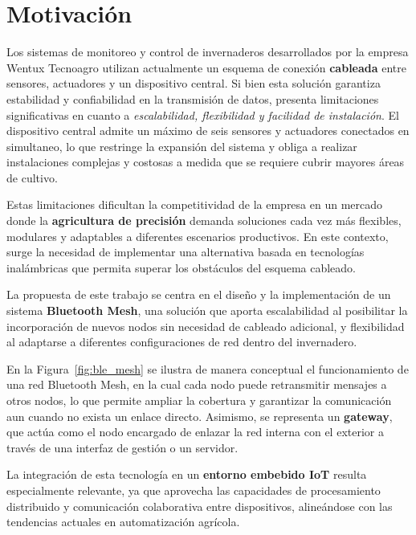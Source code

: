  

\section{Motivación}

Los sistemas de monitoreo y control de invernaderos desarrollados por la empresa Wentux Tecnoagro utilizan actualmente un esquema de conexión \textbf{cableada} entre sensores, actuadores y un dispositivo central. Si bien esta solución garantiza estabilidad y confiabilidad en la transmisión de datos, presenta limitaciones significativas en cuanto a \textit{escalabilidad, flexibilidad y facilidad de instalación}. El dispositivo central admite un máximo de seis sensores y actuadores conectados en simultaneo, lo que restringe la expansión del sistema y obliga a realizar instalaciones complejas y costosas a medida que se requiere cubrir mayores áreas de cultivo.

Estas limitaciones dificultan la competitividad de la empresa en un mercado donde la \textbf{agricultura de precisión} demanda soluciones cada vez más flexibles, modulares y adaptables a diferentes escenarios productivos. En este contexto, surge la necesidad de implementar una alternativa basada en tecnologías inalámbricas que permita superar los obstáculos del esquema cableado.

La propuesta de este trabajo se centra en el diseño y la implementación de un sistema \textbf{Bluetooth Mesh}, una solución que aporta escalabilidad al posibilitar la incorporación de nuevos nodos sin necesidad de cableado adicional, y flexibilidad al adaptarse a diferentes configuraciones de red dentro del invernadero. 

En la Figura~\ref{fig:ble_mesh} se ilustra de manera conceptual el funcionamiento de una red Bluetooth Mesh, en la cual cada nodo puede retransmitir mensajes a otros nodos, lo que permite ampliar la cobertura y garantizar la comunicación aun cuando no exista un enlace directo. Asimismo, se representa un \textbf{gateway}, que actúa como el nodo encargado de enlazar la red interna con el exterior a través de una interfaz de gestión o un servidor.

La integración de esta tecnología en un \textbf{entorno embebido IoT} resulta especialmente relevante, ya que aprovecha las capacidades de procesamiento distribuido y comunicación colaborativa entre dispositivos, alineándose con las tendencias actuales en automatización agrícola.

